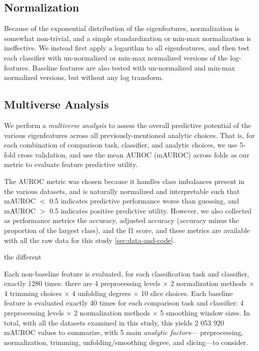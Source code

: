 \documentclass[12pt]{spieman}  %
\begin{document}
\begin{spacing}{2}
\subsection{Normalization}

Because of the exponential distribution of the eigenfeatures, normalization is
somewhat non-trivial, and a simple standardization or min-max normalization is
ineffective. We instead first apply a logarithm to all eigenfeatures, and then
test each classifier with un-normalized or min-max normalized versions of the
log-features. Baseline features are also tested with un-normalized and min-max
normalized versions, but without any log transform.





\subsection{Multiverse Analysis}
\label{sec:multiverse}

We perform a \textit{multiverse
analysis}\cite{steegenIncreasingTransparencyMultiverse2016} to assess the
overall predictive potential of the various eigenfeatures across all
previously-mentioned analytic choices. That is, for each combination of
comparison task, classifier, and analytic choices, we use 5-fold cross
validation, and use the mean AUROC (mAUROC) across folds as our metric to
evaluate feature predictive utility.

The AUROC metric was chosen because it handles class imbalances present in the
various datasets, and is naturally normalized and interpretable such that
mAUROC \(<\) 0.5 indicates predictive performance worse than guessing, and
mAUROC \(>\) 0.5 indicates positive predictive
utility\cite{mandrekarReceiverOperatingCharacteristic2010}. However, we also
collected as performance metrics the accuracy, adjusted accuracy (accuracy
minus the proportion of the largest class), and the f1 score, and these metrics
are available with all the raw data for this study \ref{sec:data-and-code}.

the different

Each non-baseline feature is evaluated, for each classification task and
classifier, exactly 1280 times: there are 4 preprocessing levels \(\times\) 2
normalization methods \(\times\) 4 trimming choices \(\times\) 4 unfolding
degrees  \(\times\) 10 slice choices. Each baseline feature is evaluated
exactly 40 times for each comparison task and classifier: 4 preprocessing
levels \(\times\) 2 normalization methods \(\times\) 5 smoothing window sizes.
In total, with all the datasets examined in this study, this yields 2 053 920
mAUROC values to summarize, with 5 main \textit{analytic factors}—
preprocessing, normalization, trimming, unfolding/smoothing degree, and
slicing—to consider.


\end{spacing}
\end{document}
